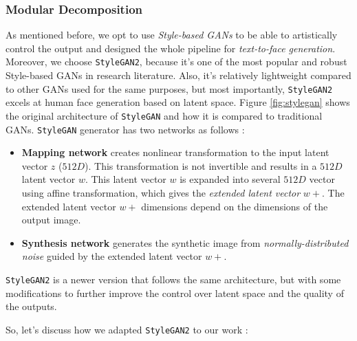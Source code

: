 \subsubsection{Modular Decomposition}

As mentioned before, we opt to use \emph{Style-based GANs} to be able to artistically control the output and designed the whole pipeline for \emph{text-to-face generation}. Moreover, we choose \texttt{StyleGAN2}, because it's one of the most popular and robust Style-based GANs in research literature. Also, it's relatively lightweight compared to other GANs used for the same purposes, but most importantly, \texttt{StyleGAN2} excels at human face generation based on latent space. Figure \ref{fig:stylegan} shows the original architecture of \texttt{StyleGAN} and how it is compared to traditional GANs. \texttt{StyleGAN} generator has two networks as follows :

\begin{itemize}
    \item \textbf{Mapping network} creates nonlinear transformation to the input latent vector $z$ ($512D$). This transformation is not invertible and results in a $512D$ latent vector $w$. This latent vector $w$ is expanded into several $512D$ vector using affine transformation, which gives the \emph{extended latent vector} $w+$. The extended latent vector $w+$ dimensions depend on the dimensions of the output image.
    \item \textbf{Synthesis network} generates the synthetic image from \emph{normally-distributed noise} guided by the extended latent vector $w+$.
\end{itemize}

\texttt{StyleGAN2} \cite{karras2020analyzing} is a newer version that follows the same architecture, but with some modifications to further improve the control over latent space and the quality of the outputs. 

So, let's discuss how we adapted \texttt{StyleGAN2} to our work :

